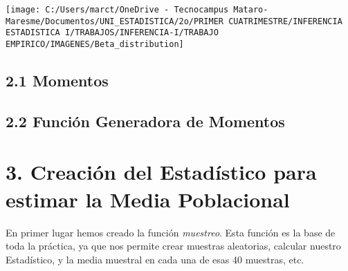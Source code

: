 \documentclass[
]{article}
\begin{document}
\begin{center}\texttt{[image: C:/Users/marct/OneDrive - Tecnocampus Mataro-Maresme/Documentos/UNI\_ESTADISTICA/2o/PRIMER CUATRIMESTRE/INFERENCIA ESTADISTICA I/TRABAJOS/INFERENCIA-I/TRABAJO EMPIRICO/IMAGENES/Beta\_distribution]} \end{center}

\hypertarget{momentos}{%
\subsection{2.1 Momentos}\label{momentos}}

\hypertarget{funciuxf3n-generadora-de-momentos}{%
\subsection{2.2 Función Generadora de
Momentos}\label{funciuxf3n-generadora-de-momentos}}

\hypertarget{creaciuxf3n-del-estaduxedstico-para-estimar-la-media-poblacional}{%
\section{3. Creación del Estadístico para estimar la Media
Poblacional}\label{creaciuxf3n-del-estaduxedstico-para-estimar-la-media-poblacional}}

En primer lugar hemos creado la función \emph{muestreo}. Esta función es
la base de toda la práctica, ya que nos permite crear muestras
aleatorias, calcular nuestro Estadístico, y la media muestral en cada
una de esas 40 muestras, etc.
\end{document}
